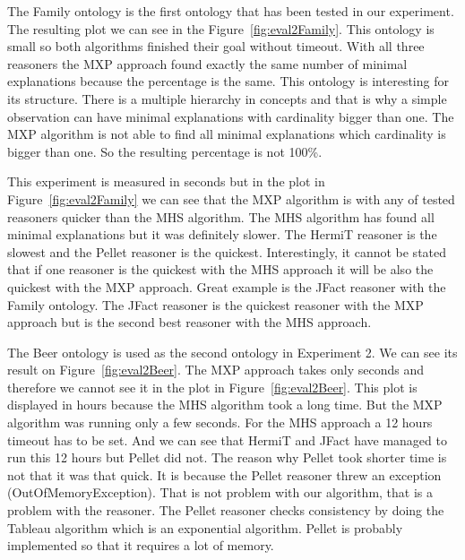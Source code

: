 \documentclass[12pt,a4paper]{article}
\begin{document}
The Family ontology is the first ontology that has been tested in our experiment. The resulting plot we can see in the Figure~\ref{fig:eval2Family}. This ontology is small so both algorithms finished their goal without timeout. With all three reasoners the MXP approach found exactly the same number of minimal explanations because the percentage is the same. This ontology is interesting for its structure. There is a multiple hierarchy in concepts and that is why a simple observation can have minimal explanations with cardinality bigger than one. The MXP algorithm is not able to find all minimal explanations which cardinality is bigger than one. So the resulting percentage is not 100\%. 

This experiment is measured in seconds but in the plot in Figure~\ref{fig:eval2Family} we can see that the MXP algorithm is with any of tested reasoners quicker than the MHS algorithm. The MHS algorithm has found all minimal explanations but it was definitely slower. The HermiT reasoner is the slowest and the Pellet reasoner is the quickest. Interestingly, it cannot be stated that if one reasoner is the quickest with the MHS approach it will be also the quickest with the MXP approach. Great example is the JFact reasoner with the Family ontology. The JFact reasoner is the quickest reasoner with the MXP approach but is the second best reasoner with the MHS approach.

The Beer ontology is used as the second ontology in Experiment 2. We can see its result on Figure~\ref{fig:eval2Beer}. The MXP approach takes only seconds and therefore we cannot see it in the plot in Figure~\ref{fig:eval2Beer}. This plot is displayed in hours because the MHS algorithm took a long time. But the MXP algorithm was running only a few seconds. For the MHS approach a 12 hours timeout has to be set. And we can see that HermiT and JFact have managed to run this 12 hours but Pellet did not. The reason why Pellet took shorter time is not that it was that quick. It is because the Pellet reasoner threw an exception (OutOfMemoryException). That is not problem with our algorithm, that is a problem with the reasoner. The Pellet reasoner checks consistency by doing the Tableau algorithm which is an exponential algorithm. Pellet is probably implemented so that it requires a lot of memory. 
\end{document}
